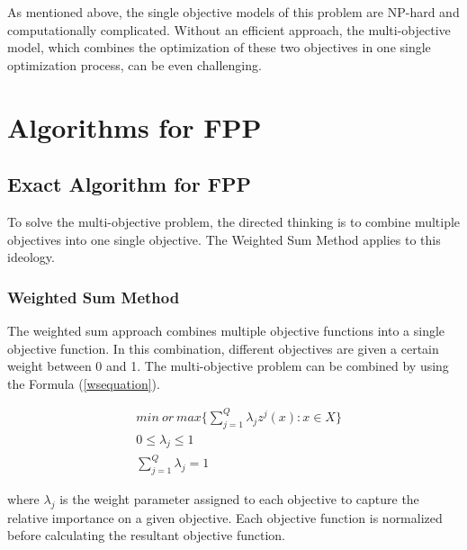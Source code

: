 \documentclass[10pt,journal,compsoc]{IEEEtran}
\newcommand{\Eq}[1]{(\ref{#1})}
\begin{document}

As mentioned above, the single objective models of this problem are NP-hard and computationally complicated. Without an efficient approach, the multi-objective model, which combines the optimization of these two objectives in one single optimization process, can be even challenging.

\section{Algorithms for FPP}\label{alfpp}

\subsection{Exact Algorithm for FPP}
To solve the multi-objective problem, the directed thinking is to combine multiple objectives into one single objective. The Weighted Sum Method applies to this ideology.

\subsubsection{Weighted Sum Method}
The weighted sum approach combines multiple objective functions into a single objective function. In this combination, different objectives are given a certain weight between 0 and 1. The multi-objective problem can be combined by using the Formula \Eq{wsequation}.

\begin{align}
&min\ or\ max \bigg\{\sum_{j=1}^Q \lambda_j z^j (x) : x \in X \bigg\}\label{wsequation}\\
&0\leq \lambda_j \leq 1\\
&\sum_{j=1}^Q \lambda_j = 1
\end{align}

where $\lambda_j$ is the weight parameter assigned to each objective to capture the relative importance on a given objective. Each objective function is normalized before calculating the resultant objective function. %
\end{document}

